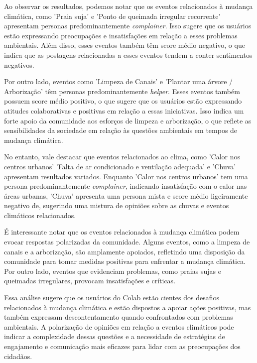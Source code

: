 Ao observar os resultados, podemos notar que os eventos relacionados à mudança climática, como 'Praia suja' e 'Ponto de queimada irregular recorrente' apresentam personas predominantemente \textit{complainer}. Isso sugere que os usuários estão expressando preocupações e insatisfações em relação a esses problemas ambientais. Além disso, esses eventos também têm score médio negativo, o que indica que as postagens relacionadas a esses eventos tendem a conter sentimentos negativos.

Por outro lado, eventos como 'Limpeza de Canais' e 'Plantar uma árvore / Arborização' têm personas predominantemente \textit{helper}. Esses eventos também possuem score médio positivo, o que sugere que os usuários estão expressando atitudes colaborativas e positivas em relação a essas iniciativas. Isso indica um forte apoio da comunidade aos esforços de limpeza e arborização, o que reflete as sensibilidades da sociedade em relação às questões ambientais em tempos de mudança climática.

No entanto, vale destacar que eventos relacionados ao clima, como 'Calor nos centros urbanos' 'Falta de ar condicionado e ventilação adequada' e 'Chuva' apresentam resultados variados. Enquanto 'Calor nos centros urbanos' tem uma persona predominantemente \textit{complainer}, indicando insatisfação com o calor nas áreas urbanas, 'Chuva' apresenta uma persona mista e score médio ligeiramente negativo de, sugerindo uma mistura de opiniões sobre as chuvas e eventos climáticos relacionados.

É interessante notar que os eventos relacionados à mudança climática podem evocar respostas polarizadas da comunidade. Alguns eventos, como a limpeza de canais e a arborização, são amplamente apoiados, refletindo uma disposição da comunidade para tomar medidas positivas para enfrentar a mudança climática. Por outro lado, eventos que evidenciam problemas, como praias sujas e queimadas irregulares, provocam insatisfações e críticas.

Essa análise sugere que os usuários do Colab estão cientes dos desafios relacionados à mudança climática e estão dispostos a apoiar ações positivas, mas também expressam descontentamento quando confrontados com problemas ambientais. A polarização de opiniões em relação a eventos climáticos pode indicar a complexidade dessas questões e a necessidade de estratégias de engajamento e comunicação mais eficazes para lidar com as preocupações dos cidadãos.

